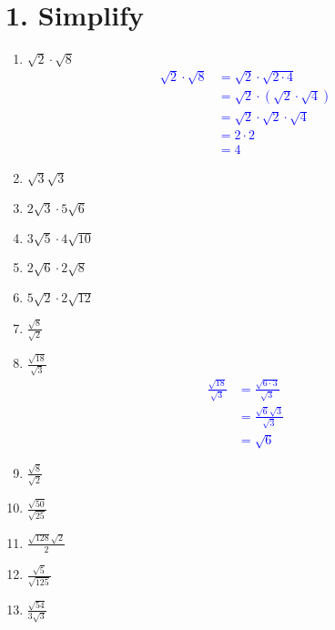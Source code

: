 \documentclass[fleqn,12pt]{article}
\newcommand{\studentworkspace}{\vspace{1.5cm}}
\newcommand{\studentxlargeworkspace}{\vspace{3.5cm}}
\begin{document}
\section*{\normalsize 1. Simplify}
\begin{enumerate}[label=\alph*.]
    \item $\sqrt{2} \cdot \sqrt{8}$
        \textcolor{blue}{
        \begin{align*}
            \sqrt{2} \cdot \sqrt{8} &= \sqrt{2} \cdot \sqrt{2 \cdot 4} \\
                                    &= \sqrt{2} \cdot (\sqrt{2} \cdot \sqrt{4}) \\
                                    &= \sqrt{2} \cdot \sqrt{2} \cdot \sqrt{4} \\
                                    &= 2 \cdot 2 \\
                                    &= 4
        \end{align*}
        }
    \item $\sqrt{3}\sqrt{3}$
        \studentworkspace
    \item $2\sqrt{3} \cdot 5\sqrt{6}$
        \studentxlargeworkspace
    \item $3\sqrt{5} \cdot 4\sqrt{10}$
        \studentxlargeworkspace
    \item $2\sqrt{6} \cdot 2\sqrt{8}$
        \studentxlargeworkspace
    \item $5\sqrt{2} \cdot 2\sqrt{12}$
        \studentxlargeworkspace
    \item $\frac{\sqrt{8}}{\sqrt{2}}$
        \studentxlargeworkspace
    \item $\frac{\sqrt{18}}{\sqrt{3}}$
        \textcolor{blue}{
        \begin{align*}
            \frac{\sqrt{18}}{\sqrt{3}} &= \frac{\sqrt{6 \cdot 3}}{\sqrt{3}} \\
                                       &= \frac{\sqrt{6} \sqrt{3}}{\sqrt{3}} \\
                                       &= \sqrt{6}
        \end{align*}
        }
    \item $\frac{\sqrt{8}}{\sqrt{2}}$
        \studentxlargeworkspace
    \item $\frac{\sqrt{50}}{\sqrt{25}}$
        \studentxlargeworkspace
    \item $\frac{\sqrt{128}\sqrt{2}}{2}$
        \studentxlargeworkspace
    \item $\frac{\sqrt{5}}{\sqrt{125}}$
        \studentxlargeworkspace
    \item $\frac{\sqrt{54}}{3\sqrt{3}}$
        \studentxlargeworkspace
\end{enumerate}
\end{document}
